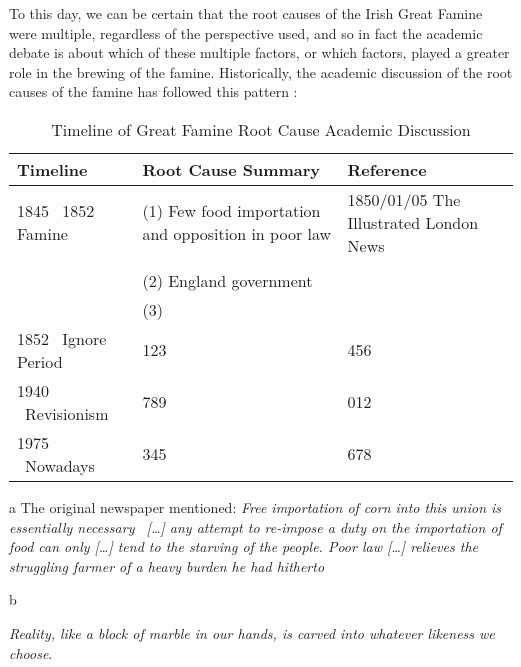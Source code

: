 To this day, we can be certain that the root causes of the Irish Great Famine were multiple, regardless of the perspective used, and so in fact the academic debate is about which of these multiple factors, or which factors, played a greater role in the brewing of the famine. Historically, the academic discussion of the root causes of the famine has followed this pattern \citep{henderson2005irish}:

\begin{table}[h]
    \centering
	\begin{threeparttable}
    \caption{Timeline of Great Famine Root Cause Academic Discussion}
		\begin{tabular}{lp{5cm}p{5cm}}
			\toprule
			Timeline & Root Cause Summary & Reference \\
			\midrule
			1845 \textendash\ 1852 Famine & (1) Few food importation and opposition in poor law & 1850/01/05 The Illustrated London News\tnote{a} \\
			& & \\
			& (2) England government &  \\
			& (3) & \\
			1852 \textendash\ Ignore Period & 123 & 456 \\
			1940 \textendash\ Revisionism & 789 & 012 \\
			1975 \textendash\ Nowadays & 345 & 678 \\
			\bottomrule
		\end{tabular}
		\begin{tablenotes}
			\item[a] The original newspaper mentioned: \textit{Free importation of corn into this union is essentially necessary \textendash\ [\ldots] any attempt to re-impose a duty on the importation of food can only [\ldots]  tend to the starving of the people. Poor law [\ldots] relieves the struggling farmer of a heavy burden he had hitherto} \citep{1850_01_05_news}
			\item[b] 
		\end{tablenotes}
	\end{threeparttable}
\end{table}

\textit{Reality, like a block of marble in our hands, is carved into whatever likeness we choose}. 

